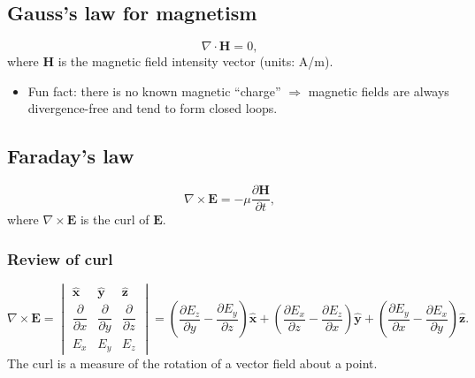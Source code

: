 \documentclass[11pt, oneside]{article}
\begin{document}
\subsection{Gauss's law for magnetism}

\begin{equation}
	\label{e:gauss_m}
	\nabla\cdot\mathbf{H} = 0,
\end{equation}
where $\mathbf{H}$ is the magnetic field intensity vector (units: A/m).
\begin{itemize}
	\item Fun fact: there is no known magnetic ``charge'' $\Rightarrow$ magnetic fields are always divergence-free and tend to form closed loops.
\end{itemize}

\subsection{Faraday's law}

\begin{equation}
	\label{e:faraday}
	\nabla\times\mathbf{E} = -\mu\frac{\partial\mathbf{H}}{\partial t},
\end{equation}
where $\nabla\times\mathbf{E}$ is the curl of $\mathbf{E}$.

\subsubsection{Review of curl}

\begin{equation}
	\nabla\times\mathbf{E} =
	\begin{vmatrix}
		\hat{\mathbf{x}} & \hat{\mathbf{y}} & \hat{\mathbf{z}} \\[2pt]
		\dfrac{\partial}{\partial x} & \dfrac{\partial}{\partial y} & \dfrac{\partial}{\partial z} \\[8pt]
		E_x & E_y & E_z
	\end{vmatrix}
	= \left(\frac{\partial E_z}{\partial y} - \frac{\partial E_y}{\partial z}\right)\hat{\mathbf{x}}
	+ \left(\frac{\partial E_x}{\partial z} - \frac{\partial E_z}{\partial x}\right)\hat{\mathbf{y}}
	+ \left(\frac{\partial E_y}{\partial x} - \frac{\partial E_x}{\partial y}\right)\hat{\mathbf{z}}.
\end{equation}
The curl is a measure of the rotation of a vector field about a point.
\end{document}

